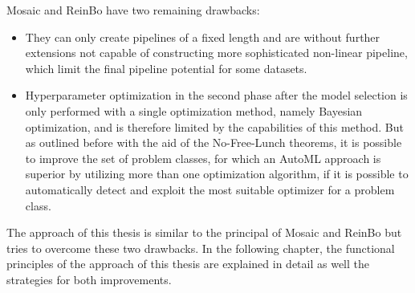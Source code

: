 Mosaic and ReinBo have two remaining drawbacks:
\begin{itemize}
    \item They can only create pipelines of a fixed length and are without further extensions not capable of constructing more sophisticated non-linear pipeline, which limit the final pipeline potential for some datasets.
    \item Hyperparameter optimization in the second phase after the model selection is only performed with a single optimization method, namely Bayesian optimization, and is therefore limited by the capabilities of this method.
    But as outlined before with the aid of the No-Free-Lunch theorems, it is possible to improve the set of problem classes, for which an AutoML approach is superior by utilizing more than one optimization algorithm, if it is possible to automatically detect and exploit the most suitable optimizer for a problem class.
\end{itemize}
The approach of this thesis is similar to the principal of Mosaic and ReinBo but tries to overcome these two drawbacks.
In the following chapter, the functional principles of the approach of this thesis are explained in detail as well the strategies for both improvements.
